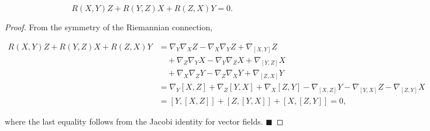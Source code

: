 \begin{proposition}
  \label{prop:dc-ch4-2-4}
  \leanok
  $$
  R(X,Y)Z+R(Y,Z)X+R(Z,X)Y=0.
  $$
\end{proposition}
\begin{proof}
  \leanok
  From the symmetry of the Riemannian connection,
  
  $$
  \begin{aligned}R(X,Y)Z+R(Y,Z)X+R(Z,X)Y&=\nabla_Y\nabla_X Z-\nabla_X\nabla_Y Z+\nabla_{[X,Y]}Z\\&\quad+\nabla_Z\nabla_Y X-\nabla_Y\nabla_Z X+\nabla_{[Y,Z]}X\\&\quad+\nabla_X\nabla_Z Y-\nabla_Z\nabla_X Y+\nabla_{[Z,X]}Y\\&=\nabla_Y[X,Z]+\nabla_Z[Y,X]+\nabla_X[Z,Y]-\nabla_{[X,Z]}Y-\nabla_{[Y,X]}Z-\nabla_{[Z,Y]}X\\&=[Y,[X,Z]]+[Z,[Y,X]]+[X,[Z,Y]]=0,\end{aligned}
  $$
  
  where the last equality follows from the Jacobi identity for vector fields.
  $\blacksquare$
\end{proof}

